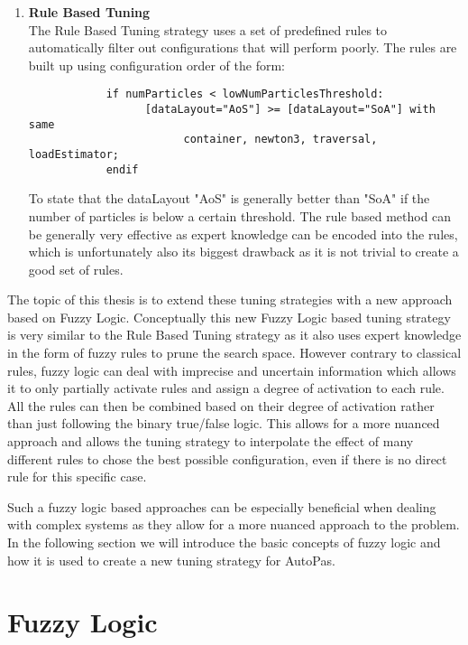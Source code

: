 \begin{enumerate}
      \item \textbf{Rule Based Tuning} \\
            The Rule Based Tuning strategy uses a set of predefined rules to automatically filter out configurations that will perform poorly. The rules are built up using configuration order of the form:
            \begin{small}
                  \begin{verbatim}
            if numParticles < lowNumParticlesThreshold:
                  [dataLayout="AoS"] >= [dataLayout="SoA"] with same 
                        container, newton3, traversal, loadEstimator;
            endif
            \end{verbatim}
            \end{small}
            To state that the dataLayout "AoS" is generally better than "SoA" if the number of particles is below a certain threshold. The rule based method can be generally very effective as expert knowledge can be encoded into the rules, which is unfortunately also its biggest drawback as it is not trivial to create a good set of rules.
\end{enumerate}


The topic of this thesis is to extend these tuning strategies with a new approach based on Fuzzy Logic. Conceptually this new Fuzzy Logic based tuning strategy is very similar to the Rule Based Tuning strategy as it also uses expert knowledge in the form of fuzzy rules to prune the search space. However contrary to classical rules, fuzzy logic can deal with imprecise and uncertain information which allows it to only partially activate rules and assign a degree of activation to each rule. All the rules can then be combined based on their degree of activation rather than just following the binary true/false logic. This allows for a more nuanced approach and allows the tuning strategy to interpolate the effect of many different rules to chose the best possible configuration, even if there is no direct rule for this specific case.

Such a fuzzy logic based approaches can be especially beneficial when dealing with complex systems  as they allow for a more nuanced approach to the problem. In the following section we will introduce the basic concepts of fuzzy logic and how it is used to create a new tuning strategy for AutoPas.


\section{Fuzzy Logic}

